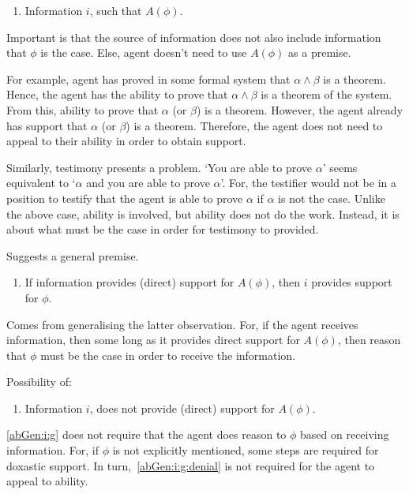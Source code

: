 \begin{enumerate}
\item\label{abGen:i} Information \(i\), such that \(A(\phi)\).
\end{enumerate}

Important is that the source of information does not also include information that \(\phi\) is the case.
Else, agent doesn't need to use \(A(\phi)\) as a premise.

For example, agent has proved in some formal system that \(\alpha \land \beta\) is a theorem.
Hence, the agent has the ability to prove that \(\alpha \land \beta\) is a theorem of the system.
From this, ability to prove that \(\alpha\) (or \(\beta\)) is a theorem.
However, the agent already has support that \(\alpha\) (or \(\beta\)) is a theorem.
Therefore, the agent does not need to appeal to their ability in order to obtain support.

Similarly, testimony presents a problem.
`You are able to prove \(\alpha\)' seems equivalent to `\(\alpha\) and you are able to prove \(\alpha\)'.
For, the testifier would not be in a position to testify that the agent is able to prove \(\alpha\) if \(\alpha\) is not the case.
Unlike the above case, ability is involved, but ability does not do the work.
Instead, it is about what must be the case in order for testimony to provided.

Suggests a general premise.

\begin{enumerate}
\item\label{abGen:i:g} If information provides (direct) support for \(A(\phi)\), then \(i\) provides support for \(\phi\).
\end{enumerate}

Comes from generalising the latter observation.
For, if the agent receives information, then some long as it provides direct support for \(A(\phi)\), then reason that \(\phi\) must be the case in order to receive the information.

Possibility of:

\begin{enumerate}
\item\label{abGen:i:g:denial} Information \(i\), does not provide (direct) support for \(A(\phi)\).
\end{enumerate}

\ref{abGen:i:g} does not require that the agent does reason to \(\phi\) based on receiving information.
For, if \(\phi\) is not explicitly mentioned, some steps are required for doxastic support.
In turn,~\ref{abGen:i:g:denial} is not required for the agent to appeal to ability.

